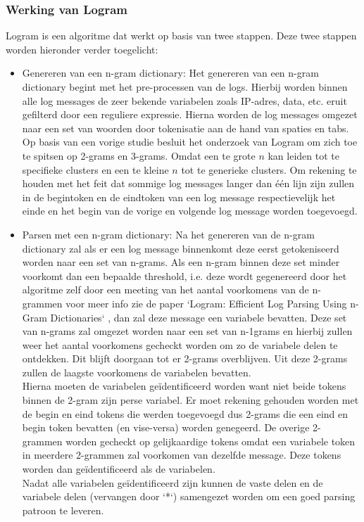 \subsubsection{Werking van Logram}
Logram is een algoritme dat werkt op basis  van twee stappen. Deze twee stappen worden hieronder verder toegelicht:
\begin{itemize}
    \item Genereren van een n-gram dictionary: Het genereren van een n-gram dictionary begint met het pre-processen van de logs. Hierbij worden binnen alle log messages de zeer bekende variabelen zoals IP-adres, data, etc. eruit gefilterd door een reguliere expressie. Hierna worden de log messages omgezet naar een set van woorden door tokenisatie aan de hand van spaties en tabs. Op basis van een vorige studie besluit het onderzoek van Logram om zich toe te spitsen op 2-grams en 3-grams. Omdat een te grote $n$ kan leiden tot te specifieke clusters en een te kleine $n$ tot te generieke clusters. Om rekening te houden met het feit dat sommige log messages langer dan één lijn zijn zullen in de begintoken en de eindtoken van een log message respectievelijk het einde en het begin van de vorige en volgende log message worden toegevoegd.\\
    
    \item Parsen met een n-gram dictionary: Na het genereren van de n-gram dictionary zal als er een log message binnenkomt deze eerst getokeniseerd worden naar een set van n-grams. Als een n-gram binnen deze set minder voorkomt dan een bepaalde threshold, i.e. deze wordt gegenereerd door het algoritme zelf door een meeting van het aantal voorkomens van de n-grammen voor meer info zie de paper `Logram: Efficient Log Parsing Using n-Gram Dictionaries` \autocite{dai2020logram}, dan zal deze message een variabele bevatten. Deze set van n-grams zal omgezet worden naar een set van n-1grams en hierbij zullen weer het aantal voorkomens gecheckt worden om zo de variabele delen te ontdekken. Dit blijft doorgaan tot er 2-grams overblijven. Uit deze 2-grams zullen de laagste voorkomens de variabelen bevatten.\\ 
    
    Hierna moeten de variabelen geïdentificeerd worden want niet beide tokens binnen de 2-gram zijn perse variabel. Er moet rekening gehouden worden met de begin en eind tokens die werden toegevoegd dus 2-grams die een eind en begin token bevatten (en vise-versa) worden genegeerd. De overige 2-grammen worden gecheckt op gelijkaardige tokens omdat een variabele token in meerdere 2-grammen zal voorkomen van dezelfde message. Deze tokens worden dan geïdentificeerd als de variabelen.\\
    
    Nadat alle variabelen geïdentificeerd zijn kunnen de vaste delen en de variabele delen (vervangen door `*`) samengezet worden om een goed parsing patroon te leveren.
\end{itemize}

